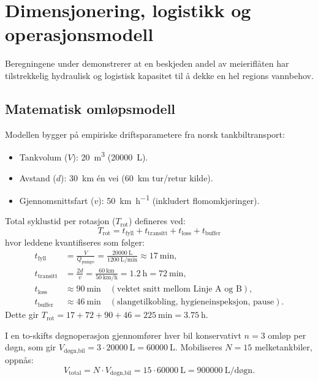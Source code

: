 \section{Dimensjonering, logistikk og operasjonsmodell}
\label{sec:dimensjonering}

Beregningene under demonstrerer at en beskjeden andel av meieriflåten har tilstrekkelig hydraulisk og logistisk kapasitet til å dekke en hel regions vannbehov.

\subsection{Matematisk omløpsmodell}
Modellen bygger på empiriske driftsparametere fra norsk tankbiltransport:
\begin{itemize}[leftmargin=1.5em, itemsep=0.15em]
    \item Tankvolum ($V$): \SI{20}{\cubic\meter} (\SI{20000}{\liter}).
    \item Avstand ($d$): \SI{30}{\kilo\meter} én vei (\SI{60}{\kilo\meter} tur/retur kilde).
    \item Gjennomsnittsfart ($v$): \SI{50}{\kilo\meter\per\hour} (inkludert flomomkjøringer).
\end{itemize}

Total syklustid per rotasjon ($T_{\text{rot}}$) defineres ved:
\begin{equation}
    T_{\text{rot}} = t_{\text{fyll}} + t_{\text{transitt}} + t_{\text{loss}} + t_{\text{buffer}}
    \label{eq:syklus}
\end{equation}
hvor leddene kvantifiseres som følger:
\begin{align*}
    t_{\text{fyll}} &= \frac{V}{Q_{\text{pumpe}}} = \frac{\SI{20000}{\liter}}{\SI{1200}{\liter\per\minute}} \approx \SI{17}{\minute}, \\
    t_{\text{transitt}} &= \frac{2d}{v} = \frac{\SI{60}{\kilo\meter}}{\SI{50}{\kilo\meter\per\hour}} = \SI{1.2}{\hour} = \SI{72}{\minute}, \\
    t_{\text{loss}} &\approx \SI{90}{\minute} \quad (\text{vektet snitt mellom Linje A og B}), \\
    t_{\text{buffer}} &\approx \SI{46}{\minute} \quad (\text{slangetilkobling, hygieneinspeksjon, pause}).
\end{align*}
Dette gir $T_{\text{rot}} = 17 + 72 + 90 + 46 = \SI{225}{\minute} = \SI{3.75}{\hour}$.

I en to-skifts døgnoperasjon gjennomfører hver bil konservativt $n = 3$ omløp per døgn, som gir $V_{\text{døgn,bil}} = 3 \cdot \SI{20000}{\liter} = \SI{60000}{\liter}$. Mobiliseres $N = 15$ melketankbiler, oppnås:
\begin{equation}
    V_{\text{total}} = N \cdot V_{\text{døgn,bil}} = 15 \cdot \SI{60000}{\liter} = \SI{900000}{\liter\per\text{døgn}}.
    \label{eq:totalvolum}
\end{equation}

